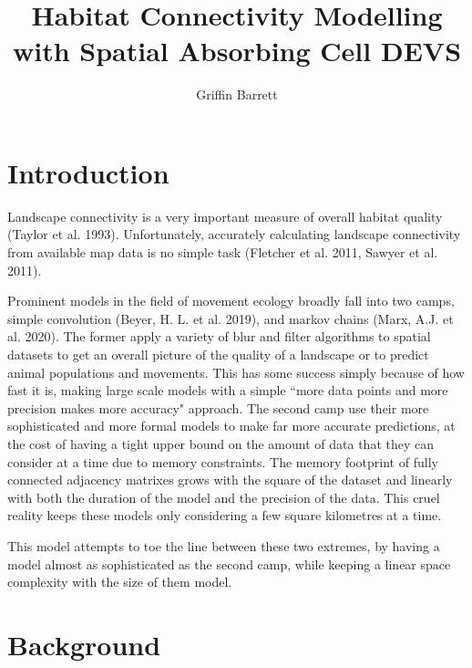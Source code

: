 \documentclass[twocolumn]{article}
\title{Habitat Connectivity Modelling with Spatial Absorbing Cell DEVS}
\author{Griffin Barrett}
\begin{document}
\clearpage
\section{Introduction}

Landscape connectivity is a very important measure of overall habitat quality (Taylor et al.
1993).
Unfortunately, accurately calculating landscape connectivity from available map data is no simple task (Fletcher et al. 2011, Sawyer et al. 2011).

Prominent models in the field of movement ecology broadly fall into two camps, simple convolution (Beyer, H. L. et al. 2019), and markov chains (Marx, A.J. et al. 2020). The former apply a variety of blur and filter algorithms to spatial datasets to get an overall picture of the quality of a landscape or to predict animal populations and movements. This has some success simply because of how fast it is, making large scale models with a simple ``more data points and more precision makes more accuracy" approach. The second camp use their more sophisticated and more formal models to make far more accurate predictions, at the cost of having a tight upper bound on the amount of data that they can consider at a time due to memory constraints. The memory footprint of fully connected adjacency matrixes grows with the square of the dataset and linearly with both the duration of the model and the precision of the data. This cruel reality keeps these models only considering a few square kilometres at a time.

This model attempts to toe the line between these two extremes, by having a model almost as sophisticated as the second camp, while keeping a linear space complexity with the size of them model.

\section{Background}
\end{document}
